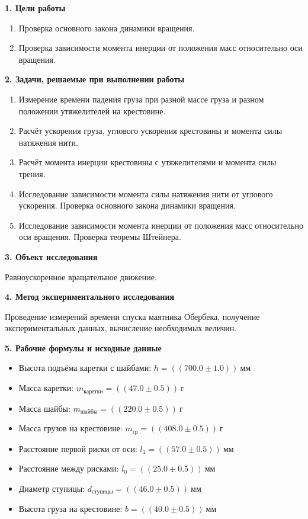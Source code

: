 \documentclass[14pt]{extreport}
\begin{document}


\vskip 15mm
\noindent\textbf{1. Цели работы}
\begin{enumerate}[label=\arabic*)]
    \item Проверка основного закона динамики вращения.
    \item Проверка зависимости момента инерции от положения масс относительно оси вращения.
\end{enumerate}


\noindent\textbf{2. Задачи, решаемые при выполнении работы}

\begin{enumerate}[label=\arabic*)]
    \item Измерение времени падения груза при разной массе груза и разном положении утяжелителей на крестовине.
    \item Расчёт ускорения груза, углового ускорения крестовины и момента силы натяжения нити.
    \item Расчёт момента инерции крестовины с утяжелителями и момента силы трения.
    \item Исследование зависимости момента силы натяжения нити от углового ускорения. Проверка основного закона динамики вращения.
    \item Исследование зависимости момента инерции от положения масс относительно оси вращения. Проверка теоремы Штейнера.
\end{enumerate}

\noindent\textbf{3. Объект исследования}

Равноускоренное вращательное движение.

\noindent\textbf{4. Метод экспериментального исследования}

Проведение измерений времени спуска маятника Обербека, получение экспериментальных данных, вычисление необходимых величин.

\noindent\textbf{5. Рабочие формулы и исходные данные}

\begin{itemize}
    \item Высота подъёма каретки с шайбами: $ h = ((700.0 \pm 1.0))~\text{мм} $
    \item Масса каретки: $ m_\text{каретки} = ((47.0 \pm 0.5))~\text{г} $
    \item Масса шайбы: $ m_\text{шайбы} = ((220.0 \pm 0.5))~\text{г} $
    \item Масса грузов на крестовине: $ m_\text{гр} = ((408.0 \pm 0.5))~\text{г} $
    \item Расстояние первой риски от оси: $ l_1 = ((57.0 \pm 0.5))~\text{мм} $
    \item Расстояние между рисками: $ l_0 = ((25.0 \pm 0.5))~\text{мм} $
    \item Диаметр ступицы: $ d_\text{ступицы} = ((46.0 \pm 0.5))~\text{мм} $
    \item Высота груза на крестовине: $ b = ((40.0 \pm 0.5))~\text{мм} $
\end{itemize}
\end{document}

